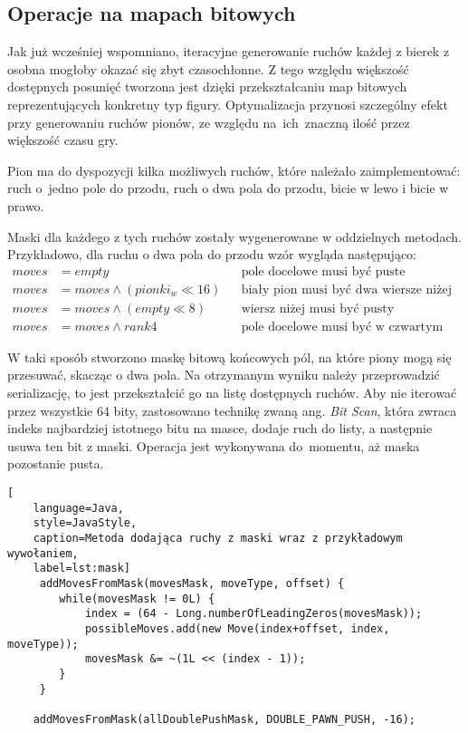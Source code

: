 \subsection{Operacje na mapach bitowych}
\label{subsec:operacje-na-mapach-bitowych}

Jak już wcześniej wspomniano, iteracyjne generowanie ruchów każdej z bierek z osobna mogłoby okazać się zbyt czasochłonne.
Z tego względu większość dostępnych posunięć tworzona jest dzięki przekształcaniu map bitowych reprezentujących konkretny typ figury.
Optymalizacja przynosi szczególny efekt przy generowaniu ruchów pionów, ze względu na~ich~znaczną ilość przez większość czasu gry.

Pion ma do dyspozycji kilka możliwych ruchów, które należało zaimplementować: ruch o~jedno pole do przodu, ruch o dwa pola do przodu, bicie w lewo i bicie w prawo.

Maski dla każdego z tych ruchów zostały wygenerowane w oddzielnych metodach.
Przykładowo, dla ruchu o dwa pola do przodu wzór wygląda następująco:
\begin{align*}
    moves & = empty && \text{pole docelowe musi być puste} \\
    moves & = moves \wedge (pionki_w\ll16) && \text{biały pion musi być dwa wiersze niżej}\\
    moves & = moves \wedge (empty\ll8) && \text{wiersz niżej musi być pusty}\\
    moves & = moves \wedge rank4 && \text{pole docelowe musi być w czwartym wierszu}
\end{align*}

W taki sposób stworzono maskę bitową końcowych pól, na które piony mogą się przesuwać, skacząc o dwa pola.
Na otrzymanym wyniku należy przeprowadzić serializację, to jest przekształcić go na listę dostępnych ruchów.
Aby nie iterować przez wszystkie 64 bity, zastosowano technikę zwaną ang. \emph{Bit Scan}, która zwraca indeks najbardziej istotnego bitu na masce, dodaje ruch do listy, a następnie usuwa ten bit z maski.
Operacja jest wykonywana do~momentu, aż maska pozostanie pusta.
\begin{lstlisting}[
    language=Java,
    style=JavaStyle,
    caption=Metoda dodająca ruchy z maski wraz z przykładowym wywołaniem,
    label=lst:mask]
     addMovesFromMask(movesMask, moveType, offset) {
        while(movesMask != 0L) {
            index = (64 - Long.numberOfLeadingZeros(movesMask));
            possibleMoves.add(new Move(index+offset, index, moveType));
            movesMask &= ~(1L << (index - 1));
        }
     }

    addMovesFromMask(allDoublePushMask, DOUBLE_PAWN_PUSH, -16);

\end{lstlisting}

